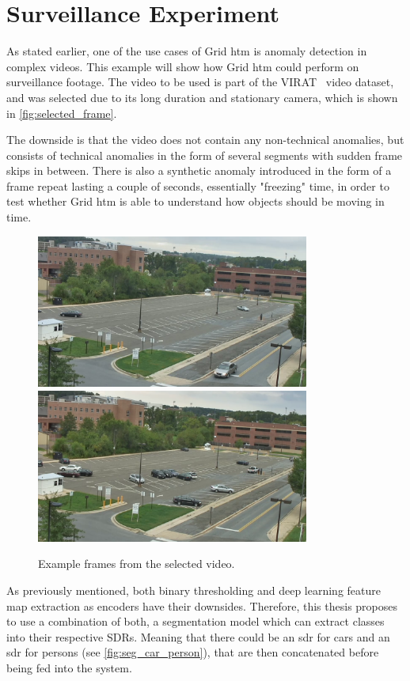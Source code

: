 \section{Surveillance Experiment}
As stated earlier, one of the use cases of Grid \gls*{htm} is anomaly detection in complex videos. This example will show how Grid \gls*{htm} could perform on surveillance footage.
The video to be used is part of the VIRAT~\cite{VIRAT} video dataset, and was selected due to its long duration and stationary camera, which is shown in \autoref{fig:selected_frame}.
\par
The downside is that the video does not contain any non-technical anomalies, but consists of technical anomalies in the form of several segments with sudden frame skips in between. There is also a synthetic anomaly introduced in the form of a frame repeat lasting a couple of seconds, essentially "freezing" time, in order to test whether Grid \gls*{htm} is able to understand how objects should be moving in time.
\begin{figure}[H]
    \centering
    \includegraphics[width=0.8\textwidth]{resources/methodology/original.png}
    \includegraphics[width=0.8\textwidth]{resources/experiments/surveillance/parking_frame.png}
    \caption[Example Frames]{Example frames from the selected video.}
    \label{fig:selected_frame}
\end{figure}
As previously mentioned, both binary thresholding and deep learning feature map extraction as encoders have their downsides. Therefore, this thesis proposes to use a combination of both, a segmentation model which can extract classes into their respective SDRs. Meaning that there could be an \gls*{sdr} for cars and an \gls*{sdr} for persons (see \autoref{fig:seg_car_person}), that are then concatenated before being fed into the system.
